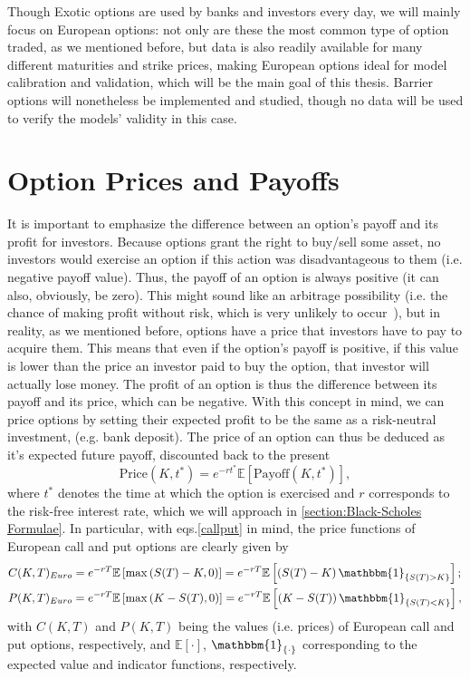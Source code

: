 Though Exotic options are used by banks and investors every day, we will mainly focus on European options: not only are these the most common type of option traded, as we mentioned before, but data is also readily available for many different maturities and strike prices, making European options ideal for model calibration and validation, which will be the main goal of this thesis.
Barrier options will nonetheless be implemented and studied, though no data will be used to verify the models' validity in this case.


\section{Option Prices and Payoffs}
It is important to emphasize the difference between an option's payoff and its profit for investors. Because options grant the right to buy/sell some asset, no investors would exercise an option if this action was disadvantageous to them (i.e. negative payoff value). Thus, the payoff of an option is always positive (it can also, obviously, be zero). This might sound like an arbitrage possibility (i.e. the chance of making profit without risk, which is very unlikely to occur~\citep{Wilmott}), but in reality, as we mentioned before, options have a price that investors have to pay to acquire them. This means that even if the option's payoff is positive, if this value is lower than the price an investor paid to buy the option, that investor will actually lose money. The profit of an option is thus the difference between its payoff and its price, which can be negative.
With this concept in mind, we can price options by setting their expected profit to be the same as a risk-neutral investment, (e.g. bank deposit). The price of an option can thus be deduced as it's expected future payoff, discounted back to the present
\begin{equation}\label{pricepayoff}
\text{Price}(K,t^*)=e^{-rt^*}\mathbb{E}\left[\text{Payoff}(K,t^*)\right],
\end{equation}
\noindent where $t^*$ denotes the time at which the option is exercised and $r$ corresponds to the risk-free interest rate, which we will approach in \autoref{section:Black-Scholes Formulae}.
In particular, with eqs.\eqref{callput} in mind, the price functions of European call and put options are clearly given by
\begin{subequations}\label{callprice}
\begin{align}
&C(K,T)_{Euro}=e^{-rT}\mathbb{E}\left[\max\left(S(T)-K,0\right)\right]=e^{-rT}\mathbb{E}\left[\left(S(T)-K\right)\mathbbm{1}_{\left\{S(T)>K\right\}}\right];\\
&P(K,T)_{Euro}=e^{-rT}\mathbb{E}\left[\max\left(K-S(T),0\right)\right]=e^{-rT}\mathbb{E}\left[\left(K-S(T)\right)\mathbbm{1}_{\left\{S(T)<K\right\}}\right],
\end{align}
\end{subequations}
\noindent with $C(K,T)$ and $P(K,T)$ being the values (i.e. prices) of European call and put options, respectively, and $\mathbb{E}[\cdot]$, $\mathbbm{1}_{\{\cdot\}}$ corresponding to the expected value and indicator functions, respectively.

